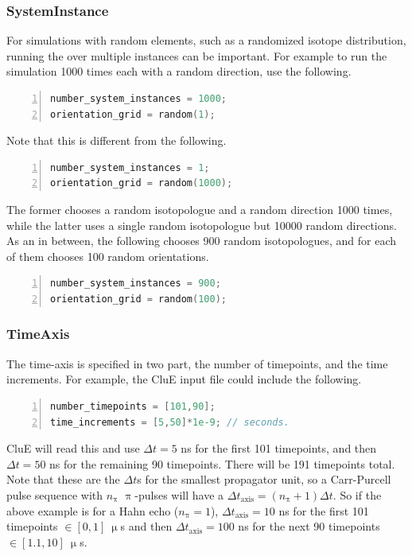 \documentclass{book}
\begin{document}
\subsubsection{SystemInstance} %
For simulations with random elements, such as a randomized isotope
distribution, running the over multiple instances can be important.
For example to run the simulation 1000 times each with a random direction,
use the following.  
\begin{lstlisting}[frame=single,numbers=left,language=c]
number_system_instances = 1000;
orientation_grid = random(1);
\end{lstlisting}
Note that this is different from the following.
\begin{lstlisting}[frame=single,numbers=left,language=c]
number_system_instances = 1;
orientation_grid = random(1000);
\end{lstlisting}
The former chooses a random isotopologue and a random direction 1000 times,
while the latter uses a single random isotopologue but 10000 random directions.
As an in between, the following chooses 900 random isotopologues, and for
each of them chooses 100 random orientations.
\begin{lstlisting}[frame=single,numbers=left,language=c]
number_system_instances = 900;
orientation_grid = random(100);
\end{lstlisting}

\subsubsection{TimeAxis} %
The time-axis is specified in two part, the number of timepoints, and 
the time increments.  For example, the CluE input file could include the
following.  
\begin{lstlisting}[frame=single,numbers=left,language=c]
number_timepoints = [101,90];
time_increments = [5,50]*1e-9; // seconds.
\end{lstlisting}
CluE will read this and use $\Delta t = 5$ ns for the first 101 timepoints,
and then $\Delta t = 50$ ns for the remaining 90 timepoints.  
There will be 191 timepoints total.  Note that these are the $\Delta t$s for 
the smallest propagator unit, so a Carr-Purcell pulse sequence with $n_\uppi$
$\uppi$-pulses will have a $\Delta t_\text{axis} = (n_\uppi +1 )\Delta t$.
So if the above example is for a Hahn echo ($n_\uppi = 1$), 
$\Delta t_\text{axis} = 10$ ns for the first 101 timepoints $\in [0, 1]\ \upmu$s 
and then $\Delta t_\text{axis} = 100$ ns for the next 90 timepoints
$\in [1.1, 10]\ \upmu$s.
\end{document}
